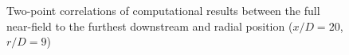 \documentclass[english]{aiaa-tc}
\begin{document}
\begin{figure}
	\centering{} 	

	\caption{Two-point correlations of computational results between the full near-field to the furthest downstream and radial position ($x/D=20$, $r/D=9$)}\label{Num_2ptcorr}
\end{figure}

\end{document}
